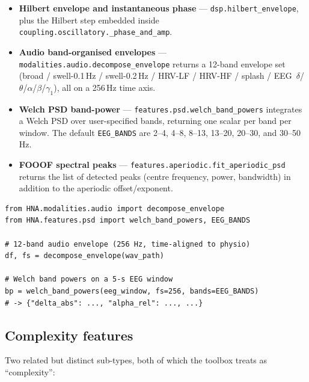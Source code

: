\documentclass[11pt,a4paper]{article}
\begin{document}
\begin{itemize}
  \item \textbf{Hilbert envelope and instantaneous phase} ---
        \texttt{dsp.hilbert\_envelope}, plus the Hilbert step embedded
        inside \texttt{coupling.oscillatory.\_phase\_and\_amp}.
  \item \textbf{Audio band-organised envelopes} ---
        \texttt{modalities.audio.decompose\_envelope} returns a 12-band
        envelope set (broad / swell-0.1\,Hz / swell-0.2\,Hz / HRV-LF /
        HRV-HF / splash / EEG~$\delta$/$\theta$/$\alpha$/$\beta$/$\gamma_1$),
        all on a 256\,Hz time axis.
  \item \textbf{Welch PSD band-power} ---
        \texttt{features.psd.welch\_band\_powers} integrates a Welch
        PSD over user-specified bands, returning one scalar per band
        per window. The default \texttt{EEG\_BANDS} are 2--4, 4--8,
        8--13, 13--20, 20--30, and 30--50\,Hz.
  \item \textbf{FOOOF spectral peaks} ---
        \texttt{features.aperiodic.fit\_aperiodic\_psd} returns the
        list of detected peaks (centre frequency, power, bandwidth)
        in addition to the aperiodic offset/exponent.
\end{itemize}

\begin{lstlisting}
from HNA.modalities.audio import decompose_envelope
from HNA.features.psd import welch_band_powers, EEG_BANDS

# 12-band audio envelope (256 Hz, time-aligned to physio)
df, fs = decompose_envelope(wav_path)

# Welch band powers on a 5-s EEG window
bp = welch_band_powers(eeg_window, fs=256, bands=EEG_BANDS)
# -> {"delta_abs": ..., "alpha_rel": ..., ...}
\end{lstlisting}

\subsection{Complexity features}

Two related but distinct sub-types, both of which the toolbox treats as
``complexity'':
\end{document}
